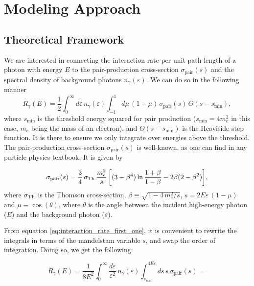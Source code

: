 \chapter{Modeling Approach}
\label{chap:The Model}

\section{Theoretical Framework}
\label{sec:Theoretical_Framework}
We are interested in connecting the interaction rate per unit path length of a photon with energy $E$ to the pair-production cross-section $\sigma_{\text{pair}}(s)$ and the spectral density of background photons $n_{\gamma}(\varepsilon)$. We can do so in the following manner \citep{Kachelrie__2012}
\begin{equation}
    R_{\gamma}(E) = \frac{1}{2}\int_{0}^{\infty}d\varepsilon \,n_{\gamma}(\varepsilon)\int_{-1}^{1}d\mu\,(1-\mu)\,\sigma_{\text{pair}}(s)\,\Theta(s-s_{\min}),
    \label{eq:interaction_rate_first_one}
\end{equation} where $s_{\min}$ is the threshold energy squared for pair production ($s_{\min} = 4m_e^2$ in this case, $m_e$ being the mass of an electron), and $\Theta(s-s_{\min})$ is the Heaviside step function. It is there to ensure we only integrate over energies above the threshold. The pair-production cross-section $\sigma_{\text{pair}}(s)$ is well-known, as one can find in any particle physics textbook. It is given by 

\begin{equation}
    \sigma_{\rm pair}(s)=\frac{3}{4}\,\sigma_{{\rm Th}}\, \frac{m_e^2}{s}
     \left[(3-\beta^{4})\ln\frac{1+\beta}{1-\beta}-2\beta(2-\beta^{2})\right]\!,
    \label{eq:sigma-pair}
\end{equation} where $\sigma_{\rm Th}$ is the Thomson cross-section, $\beta \equiv \sqrt{1-4\,m_e^2/s}$, $s = 2E\varepsilon\,(1-\mu)$ and $\mu \equiv \cos(\theta)$, where $\theta$ is the angle between the incident high-energy photon ($E$) and the background photon ($\varepsilon$).

From equation \eqref{eq:interaction_rate_first_one}, it is convenient to rewrite the integrals in terms of the mandelstam variable $s$, and swap the order of integration. Doing so, we get the following:

\begin{equation*}
    R_{\gamma}(E) = \frac{1}{8E^2}\int_{0}^{\infty}\frac{d\varepsilon}{\varepsilon^2}\,n_{\gamma}(\varepsilon)\int_{s_{\min}}^{4E\varepsilon}ds\,s\,\sigma_{\text{pair}}(s) =
    \label{eq:interaction_rate_second_one}
\end{equation*}

